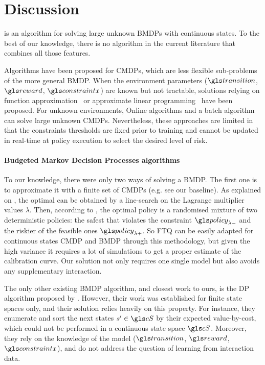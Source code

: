 \section*{Discussion}

 is an algorithm for solving large unknown \glspl{BMDP} with continuous states. To the best of our knowledge, there is no algorithm in the current literature that combines all those features.

Algorithms have been proposed for \glspl{CMDP}, which are less flexible sub-problems of the more general \gls{BMDP}. When the environment parameters ($\Ps$, $\R$, $\constraint$) are known but not tractable, solutions relying on function approximation~\citep{Undurti} or approximate linear programming~\citep{Poupart2015} have been proposed. For unknown environments, Online algorithms \citep{Geibel2005, Abe2010,AchiamHTA17,ChowGJP15} and a batch algorithm \citep{Thomas2015, Petrik2016, Laroche2019,Le2019} can solve large unknown \glspl{CMDP}. Nevertheless, these approaches are limited in that the constraints thresholds are fixed prior to training and cannot be updated in real-time at policy execution to select the desired level of risk.

\paragraph{Budgeted Markov Decision Processes algorithms}
To our knowledge, there were only two ways of solving a \gls{BMDP}. The first one is to approximate it with a finite set of \glspl{CMDP} (e.g. see our \FTQl baseline). As explained on , the optimal  can be obtained by a line-search on the Lagrange multiplier values $\lambda$. Then, according to \citet[Theorem 4.4]{BEUTLER1985236}, the optimal policy is a randomised mixture of two deterministic policies: the safest  that violates the constraint $\policy_{\lambda-}$ and the riskier of the feasible ones $\policy_{\lambda+}$. So \gls{FTQ} can be easily adapted for continuous states \gls{CMDP} and \gls{BMDP} through this methodology, but given the high variance it requires a lot of simulations to get a proper estimate of the calibration curve. Our solution not only requires one single model but also avoids any supplementary interaction.

The only other existing \gls{BMDP} algorithm, and closest work to ours, is the \gls{DP} algorithm proposed by \citet{Boutilier_Lu:uai16}. However, their work was established for finite state spaces only, and their solution relies heavily on this property. For instance, they enumerate and sort the next states $s'\in\cS$ by their expected value-by-cost, which could not be performed in a continuous state space $\cS$. Moreover, they rely on the knowledge of the model ($\Ps$, $\R$, $\constraint$), and do not address the question of learning from interaction data.


